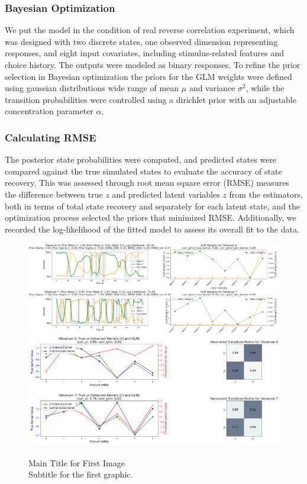 \subsubsection{Bayesian Optimization}
We put the model in the condition of real reverse correlation experiment, which was designed with two discrete states, one observed dimension representing responses, and eight input covariates, including stimulus-related features and choice history. The outputs were modeled as binary responses. To refine the prior selection in Bayesian optimization the priors for the GLM weights were defined using gaussian distributions wide range of mean $\mu$ and variance $\sigma^2$, while the transition probabilities were controlled using a dirichlet prior with an adjustable concentration parameter $\alpha$.
\subsubsection{Calculating RMSE}
The posterior state probabilities were computed, and predicted states were compared against the true simulated states to evaluate the accuracy of state recovery. This was assessed through root mean square error (RMSE) measures the difference between true $z$ and predicted latent variables $z$ from the estimators, both in terms of total state recovery and separately for each latent state, and the optimization process selected the priors that minimized RMSE. Additionally, we recorded the log-likelihood of the fitted model to assess its overall fit to the data.
\begin{figure}[H]
    \centering
    \includegraphics[width=16cm]{MainLayout/Images/chapter7/bo_glmhmm.png}
    \includegraphics[width=16cm]{MainLayout/Images/chapter7/bo_glmhmm1.png}
    \caption{Main Title for First Image \\ \small Subtitle for the first graphic.}
    \label{fig:bo_glmhmm}
\end{figure}
